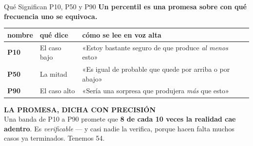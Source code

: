 \documentclass[aspectratio=169, 11pt]{beamer}
\begin{document}
\begin{frame}[shrink=24]{Qué Significan P10, P50 y P90}
  \vspace{-4pt}
  {\small\color{arcaDark}\bfseries
   Un percentil es una promesa sobre con qué frecuencia uno se equivoca.}
  \vspace{6pt}
  {\footnotesize
  \renewcommand{\arraystretch}{1.35}
  \begin{tabular}{@{}p{1.6cm}p{5.3cm}p{7.6cm}@{}}
    \toprule
    {\color{arcaDark}\bfseries nombre} &
    {\color{arcaDark}\bfseries qué dice} &
    {\color{arcaDark}\bfseries cómo se lee en voz alta} \\
    \midrule
    {\color{codeOrange}\bfseries P10} & El caso bajo &
      «Estoy bastante seguro de que produce \emph{al menos} esto» \\
    {\color{arcaDark}\bfseries P50} & La mitad &
      «Es igual de probable que quede por arriba o por abajo» \\
    {\color{codeOrange}\bfseries P90} & El caso alto &
      «Sería una sorpresa que produjera \emph{más} que esto» \\
    \bottomrule
  \end{tabular}}
  \vspace{9pt}

  \begin{tcolorbox}[colback=arcaGray, colframe=arcaDark, boxrule=0pt, leftrule=3pt,
    arc=3pt, left=8pt, right=8pt, top=6pt, bottom=6pt]
    {\scriptsize\color{arcaDark}\bfseries\faBalanceScale\hspace{4pt}LA PROMESA, DICHA CON PRECISIÓN}\\[4pt]
    {\scriptsize\color{textMuted}
     Una banda de P10 a P90 promete que \textbf{8 de cada 10 veces la
     realidad cae adentro}. Es \emph{verificable} --- y casi nadie la
     verifica, porque hacen falta muchos casos ya terminados. Tenemos 54.}
  \end{tcolorbox}
\end{frame}
\end{document}
